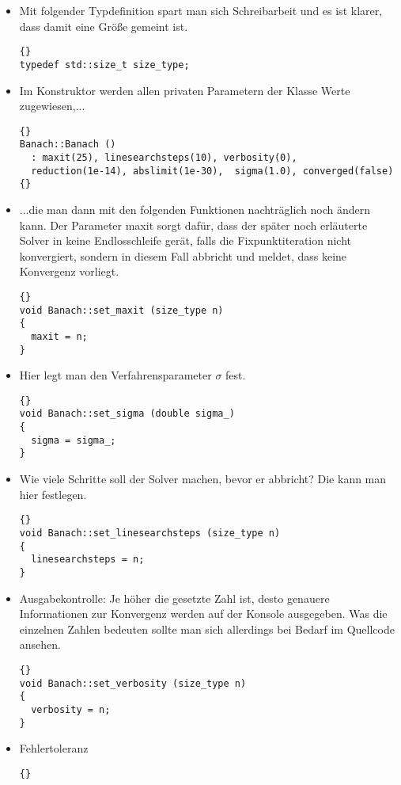 \documentclass[a4paper,11pt]{article}
\theoremstyle{definition}
\begin{document}
\begin{itemize}
\item Mit folgender Typdefinition spart man sich Schreibarbeit und es ist klarer, dass damit eine Größe gemeint ist.
{\footnotesize{\begin{lstlisting}{}
typedef std::size_t size_type; 
\end{lstlisting}}} 
\item Im Konstruktor werden allen privaten Parametern der Klasse Werte zugewiesen,...
{\footnotesize{\begin{lstlisting}{}
Banach::Banach ()
  : maxit(25), linesearchsteps(10), verbosity(0), 
  reduction(1e-14), abslimit(1e-30),  sigma(1.0), converged(false)
{}
\end{lstlisting}}}  

\item
...die man dann mit den folgenden Funktionen nachträglich noch ändern kann. Der Parameter \glqq maxit\grqq{}  sorgt dafür, dass der später noch erläuterte Solver in keine Endlosschleife gerät, falls die Fixpunktiteration nicht konvergiert, sondern in diesem Fall abbricht und meldet, dass keine Konvergenz vorliegt.
{\footnotesize{\begin{lstlisting}{}
void Banach::set_maxit (size_type n)
{
  maxit = n;
}
\end{lstlisting}}}  
\item Hier legt man den Verfahrensparameter $\sigma$ fest.
{\footnotesize{\begin{lstlisting}{}
void Banach::set_sigma (double sigma_)
{
  sigma = sigma_;
}
\end{lstlisting}}}  
\item Wie viele Schritte soll der Solver machen, bevor er abbricht? Die kann man hier festlegen.
{\footnotesize{\begin{lstlisting}{}
void Banach::set_linesearchsteps (size_type n)
{
  linesearchsteps = n;
}
\end{lstlisting}}}  
\item Ausgabekontrolle: Je höher die gesetzte Zahl ist, desto genauere Informationen zur Konvergenz werden auf der Konsole ausgegeben. Was die einzelnen Zahlen bedeuten sollte man sich allerdings bei Bedarf im Quellcode ansehen.
{\footnotesize{\begin{lstlisting}{}
void Banach::set_verbosity (size_type n)
{
  verbosity = n;
}
\end{lstlisting}}}  
\item Fehlertoleranz
{\footnotesize{\begin{lstlisting}{}

\end{lstlisting}}}
\end{itemize}
\end{document}
